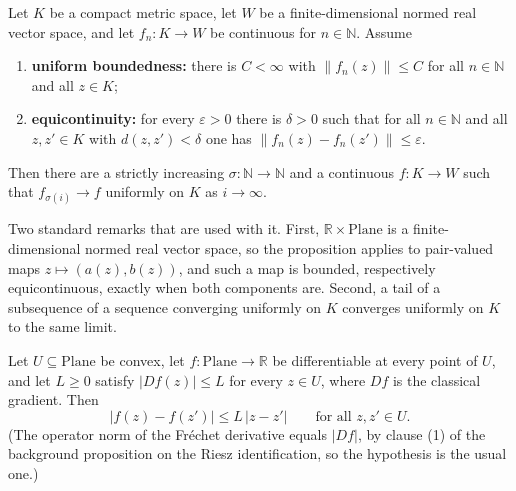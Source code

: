 \begin{proposition}
Let $K$ be a compact metric space, let $W$ be a finite-dimensional normed real vector space,
and let $f_n\colon K\to W$ be continuous for $n\in\mathbb{N}$.  Assume
\begin{enumerate}
\item \textbf{uniform boundedness:} there is $C<\infty$ with $\lVert f_n(z)\rVert\le C$ for all
$n\in\mathbb{N}$ and all $z\in K$;
\item \textbf{equicontinuity:} for every $\varepsilon>0$ there is $\delta>0$ such that for all
$n\in\mathbb{N}$ and all $z,z'\in K$ with $d(z,z')<\delta$ one has
$\lVert f_n(z)-f_n(z')\rVert\le\varepsilon$.
\end{enumerate}
Then there are a strictly increasing $\sigma\colon\mathbb{N}\to\mathbb{N}$ and a continuous
$f\colon K\to W$ such that $f_{\sigma(i)}\to f$ uniformly on $K$ as $i\to\infty$.

Two standard remarks that are used with it.  First, $\mathbb{R}\times\mathrm{Plane}$ is a
finite-dimensional normed real vector space, so the proposition applies to pair-valued maps
$z\mapsto(a(z),b(z))$, and such a map is bounded, respectively equicontinuous, exactly when both
components are.  Second, a tail of a subsequence of a sequence converging uniformly on $K$
converges uniformly on $K$ to the same limit.
\end{proposition}

\begin{proposition}
Let $U\subseteq\mathrm{Plane}$ be convex, let $f\colon\mathrm{Plane}\to\mathbb{R}$ be
differentiable at every point of $U$, and let $L\ge0$ satisfy
$\lvert Df(z)\rvert\le L$ for every $z\in U$, where $Df$ is the classical gradient.  Then
\[
  \lvert f(z)-f(z')\rvert\le L\,\lvert z-z'\rvert\qquad\text{for all }z,z'\in U.
\]
(The operator norm of the Fr\'echet derivative equals $\lvert Df\rvert$, by clause (1) of the
background proposition on the Riesz identification, so the hypothesis is the usual one.)
\end{proposition}

